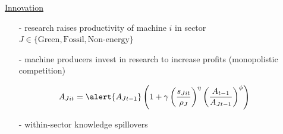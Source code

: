 \documentclass[11pt,aspectratio=169]{beamer}
\begin{document}
		\addtocounter{framenumber}{-1}
\begin{frame}{\hyperlink{modma}{Innovation}}
	\vspace{-2mm}
	\begin{itemize}
		\item[-] research raises productivity of machine $i$ in sector $J\in\{\text{Green},\text{Fossil},\text{Non-energy}\}$ \vspace{-1mm}
		\item[-] machine producers invest in research to increase profits \small{(monopolistic competition)}
		\vspace{-1mm}
		\normalsize
	\end{itemize}
	\vspace{-1.4mm}
	\large
	\begin{align*}
		A_{Jit}=\alert{A_{Jt-1}}\left(1+\gamma\left(\frac{s_{Jit}}{\rho_J}\right)^\eta\left(\frac{A_{t-1}}{A_{Jt-1}}\right)^\phi\right)
	\end{align*}
	\normalsize
	\vspace{-1.9mm}
	\begin{enumerate}
		\item[-] \alert{within-sector knowledge spillovers} \vspace{-1mm} %
		\item[] \  %
		\vspace{-1mm}
		\item[] \
	\end{enumerate}
	\small
\vspace{4mm}
\hspace{-2mm}
\begin{minipage}[t!]{0.43\textwidth}

\end{minipage}
\end{frame}
\end{document}
